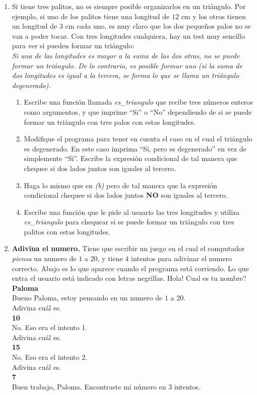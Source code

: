 \documentclass[10pt, twocolumn]{article}
\begin{document}
\begin{enumerate}
\item Si tiene tres palitos, no es siempre posible organizarlos en un triángulo. Por ejemplo, si uno de los palitos tiene una longitud de $12$ cm y los otros tienen un longitud de $3$ cm cada uno, es muy claro que los dos pequeños palos no se van a poder tocar. Con tres longitudes cualquiera, hay un test muy sencillo para ver si pueden formar un triángulo:\\
	\vskip -4mm
	\emph{Si una de las longitudes es mayor a la suma de las dos otras, no se puede formar un triángulo. De lo contrario, es posible formar uno (si la suma de dos longitudes es igual a la tercera, se forma lo que se llama un triángulo degenerado).}
\begin{enumerate}
	\item Escribe una función llamada \emph{es\_triangulo} que recibe tres números enteros como argumentos, y que imprime ``Si'' o ``No'' dependiendo de si se puede formar un triángulo con tres palos con estas longitudes. 
	\item Modifique el programa para tener en cuenta el caso en el cual el triángulo es degenerado. En este caso imprima ``Si, pero es degenerado'' en vez de simplemente ``Si''. Escribe la expresión condicional de tal manera que chequee si dos lados juntos son iguales al tercero.
	\item Haga lo mismo que en \emph{(b)} pero de tal manera que la expresión condicional chequee si dos lados juntos \textbf{NO} son iguales al tercero. 
	\item Escribe una función que le pide al usuario las tres longitudes y utiliza \emph{es\_triangulo} para chequear si se puede formar un triángulo con tres palitos con estas longitudes.
\end{enumerate}

\item {\textbf{Adivina el numero.}} Tiene que escribir un juego en el cual el computador \emph{piensa} un numero de $1$ a $20$, y tiene $4$ intentos para adivinar el numero correcto. Abajo es lo que aparece cuando el programa está corriendo. Lo que entra el usuario está indicado con letras negrillas.
\vskip 1mm
Hola! Cual es tu nombre?\\
\textbf{Paloma}\\
Bueno Paloma, estoy pensando en un numero de $1$ a $20$.\\
Adivina cuál es.\\
\textbf{10}\\
No. Eso era el intento 1.\\
Adivina cuál es.\\
\textbf{15}\\
No. Eso era el intento 2.\\
Adivina cuál es.\\
\textbf{7}\\
Buen trabajo, Paloma. Encontraste mi número en 3 intentos.


\end{enumerate}
\end{document}
